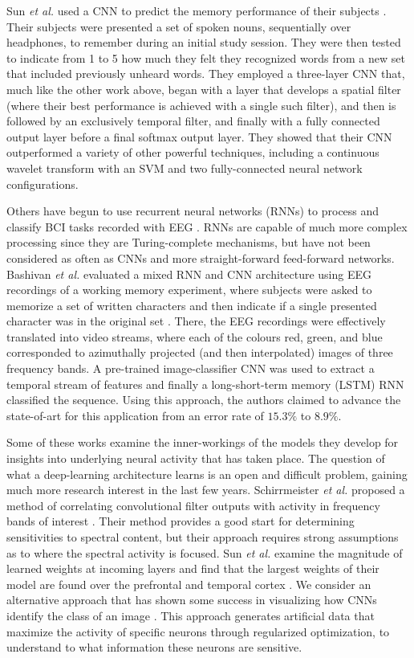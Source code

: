 \documentclass[utf8]{frontiersSCNS} %
\begin{document}
Sun {\em et al.} used a CNN to predict the memory performance of their subjects \cite{Sun}. Their subjects were presented a set of spoken nouns, sequentially over headphones, to remember during an initial study session. They were then tested to indicate from 1 to 5 how much they felt they recognized words from a new set that included previously unheard words. They employed a three-layer CNN that, much like the other work above, began with a layer that develops a spatial filter (where their best performance is achieved with a single such filter), and then is followed by an exclusively temporal filter, and finally with a fully connected output layer before a final softmax output layer. They showed that their CNN outperformed a variety of other powerful techniques, including a continuous wavelet transform with an SVM and two fully-connected neural network configurations.

Others have begun to use recurrent neural networks (RNNs) to process and classify BCI tasks recorded with EEG \cite{Bashivan2016}. RNNs are capable of much more complex processing since they are Turing-complete mechanisms, but have not been considered as often as CNNs and more straight-forward feed-forward networks. Bashivan {\em et al.} evaluated a mixed RNN and CNN architecture using EEG recordings of a working memory experiment, where subjects were asked to memorize a set of written characters and then indicate if a single presented character was in the original set \cite{Bashivan2016}. There, the EEG recordings were effectively translated into video streams, where each of the colours red, green, and blue corresponded to azimuthally projected (and then interpolated) images of three frequency bands. A pre-trained image-classifier CNN was used to extract a temporal stream of features and finally a long-short-term memory (LSTM) RNN classified the sequence. Using this approach, the authors claimed to advance the state-of-art for this application from an error rate of $15.3\%$ to $8.9\%$.

Some of these works examine the inner-workings of the models they develop for insights into underlying neural activity that has taken place. The question of what a deep-learning architecture learns is an open and difficult problem, gaining much more research interest in the last few years. Schirrmeister {\em et al.} proposed a method of correlating convolutional filter outputs with activity in frequency bands of interest \cite{Schirrmeister2017}. Their method provides a good start for determining sensitivities to spectral content, but their approach requires strong assumptions as to where the spectral activity is focused. Sun {\em et al.} examine the magnitude of learned weights at incoming layers and find that the largest weights of their model are found over the prefrontal and temporal cortex \cite{Sun}. We consider an alternative approach that has shown some success in visualizing how CNNs identify the class of an image \cite{Yosinski2015}. This approach generates artificial data that maximize the activity of specific neurons through regularized optimization, to understand to what information these neurons are sensitive. %
\end{document}
